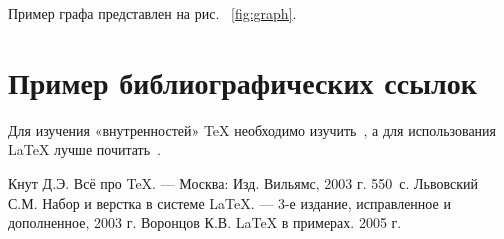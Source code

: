 \documentclass[12pt,a4paper]{scrartcl}
\begin{document}
Пример графа представлен на рис. ~\ref{fig:graph}.

\section{Пример библиографических ссылок}

Для изучения «внутренностей» \TeX{} необходимо 
изучить~\cite{Knuth-2003}, а для использования \LaTeX{} лучше
почитать~\cite{Lvovsky-2003, Voroncov-2005}.

\begin{thebibliography}{9}
Кнут Д.Э. Всё про \TeX. \newblock --- Москва: Изд. Вильямс, 2003 г. 550~с.
Львовский С.М. Набор и верстка в системе \LaTeX{}. \newblock --- 3-е издание, исправленное и дополненное, 2003 г.
Воронцов К.В. \LaTeX{} в примерах. 2005 г.
\end{thebibliography}
\end{document}
